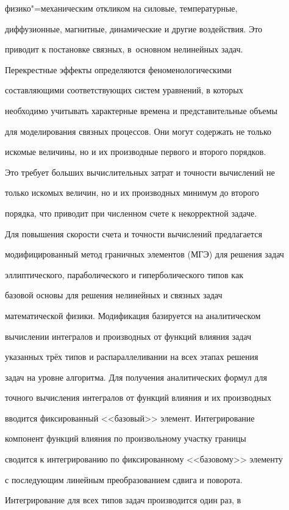 физико"=механическим откликом на силовые, температурные,

диффузионные, магнитные, динамические и другие воздействия. Это

приводит к постановке связных, в~основном нелинейных задач.

Перекрестные эффекты определяются феноменологическими

составляющими соответствующих систем уравнений, в которых

необходимо учитывать характерные времена и представительные объемы

для моделирования связных процессов. Они могут содержать не только

искомые величины, но и их производные первого  и второго порядков.

Это требует больших вычислительных затрат и точности вычислений не

только искомых величин, но и их производных минимум до второго

порядка, что приводит при численном счете к некорректной задаче.



Для повышения скорости счета и точности вычислений предлагается

модифицированный метод граничных элементов (МГЭ) для решения задач

эллиптического, параболического и гиперболического типов как

базовой основы для решения нелинейных и связных задач

математической физики. Модификация базируется на аналитическом

вычислении интегралов и производных от функций влияния задач

указанных трёх типов и распараллеливании на всех этапах решения

задач на уровне алгоритма. Для получения аналитических формул для

точного вычисления интегралов от функций влияния и их производных

вводится фиксированный <<базовый>> элемент. Интегрирование

компонент функций влияния по произвольному участку границы

сводится к интегрированию по фиксированному <<базовому>> элементу

с последующим линейным преобразованием сдвига и поворота.

Интегрирование для всех типов задач производится один раз, в

